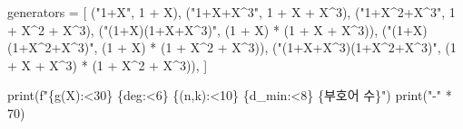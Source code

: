 \documentclass[
  oneside]{article}
\newenvironment{Shaded}{}{}
\newcommand{\BuiltInTok}[1]{\textcolor[rgb]{0.00,0.50,0.00}{#1}}
\newcommand{\DecValTok}[1]{\textcolor[rgb]{0.25,0.63,0.44}{#1}}
\newcommand{\NormalTok}[1]{#1}
\newcommand{\OperatorTok}[1]{\textcolor[rgb]{0.40,0.40,0.40}{#1}}
\newcommand{\SpecialCharTok}[1]{\textcolor[rgb]{0.25,0.44,0.63}{#1}}
\newcommand{\SpecialStringTok}[1]{\textcolor[rgb]{0.73,0.40,0.53}{#1}}
\newcommand{\StringTok}[1]{\textcolor[rgb]{0.25,0.44,0.63}{#1}}
\begin{document}
\begin{Shaded}
\begin{Highlighting}[]
\NormalTok{generators }\OperatorTok{=}\NormalTok{ [}
\NormalTok{    (}\StringTok{"1+X"}\NormalTok{,                    }\DecValTok{1} \OperatorTok{+}\NormalTok{ X),}
\NormalTok{    (}\StringTok{"1+X+X\^{}3"}\NormalTok{,                }\DecValTok{1} \OperatorTok{+}\NormalTok{ X }\OperatorTok{+}\NormalTok{ X}\OperatorTok{\^{}}\DecValTok{3}\NormalTok{),}
\NormalTok{    (}\StringTok{"1+X\^{}2+X\^{}3"}\NormalTok{,              }\DecValTok{1} \OperatorTok{+}\NormalTok{ X}\OperatorTok{\^{}}\DecValTok{2} \OperatorTok{+}\NormalTok{ X}\OperatorTok{\^{}}\DecValTok{3}\NormalTok{),}
\NormalTok{    (}\StringTok{"(1+X)(1+X+X\^{}3)"}\NormalTok{,         (}\DecValTok{1} \OperatorTok{+}\NormalTok{ X) }\OperatorTok{*}\NormalTok{ (}\DecValTok{1} \OperatorTok{+}\NormalTok{ X }\OperatorTok{+}\NormalTok{ X}\OperatorTok{\^{}}\DecValTok{3}\NormalTok{)),}
\NormalTok{    (}\StringTok{"(1+X)(1+X\^{}2+X\^{}3)"}\NormalTok{,       (}\DecValTok{1} \OperatorTok{+}\NormalTok{ X) }\OperatorTok{*}\NormalTok{ (}\DecValTok{1} \OperatorTok{+}\NormalTok{ X}\OperatorTok{\^{}}\DecValTok{2} \OperatorTok{+}\NormalTok{ X}\OperatorTok{\^{}}\DecValTok{3}\NormalTok{)),}
\NormalTok{    (}\StringTok{"(1+X+X\^{}3)(1+X\^{}2+X\^{}3)"}\NormalTok{,   (}\DecValTok{1} \OperatorTok{+}\NormalTok{ X }\OperatorTok{+}\NormalTok{ X}\OperatorTok{\^{}}\DecValTok{3}\NormalTok{) }\OperatorTok{*}\NormalTok{ (}\DecValTok{1} \OperatorTok{+}\NormalTok{ X}\OperatorTok{\^{}}\DecValTok{2} \OperatorTok{+}\NormalTok{ X}\OperatorTok{\^{}}\DecValTok{3}\NormalTok{)),}
\NormalTok{]}

\BuiltInTok{print}\NormalTok{(}\SpecialStringTok{f"}\SpecialCharTok{\{}\StringTok{\textquotesingle{}g(X)\textquotesingle{}}\SpecialCharTok{:\textless{}30\}}\SpecialStringTok{ }\SpecialCharTok{\{}\StringTok{\textquotesingle{}deg\textquotesingle{}}\SpecialCharTok{:\textless{}6\}}\SpecialStringTok{ }\SpecialCharTok{\{}\StringTok{\textquotesingle{}(n,k)\textquotesingle{}}\SpecialCharTok{:\textless{}10\}}\SpecialStringTok{ }\SpecialCharTok{\{}\StringTok{\textquotesingle{}d\_min\textquotesingle{}}\SpecialCharTok{:\textless{}8\}}\SpecialStringTok{ }\SpecialCharTok{\{}\StringTok{\textquotesingle{}부호어 수\textquotesingle{}}\SpecialCharTok{\}}\SpecialStringTok{"}\NormalTok{)}
\BuiltInTok{print}\NormalTok{(}\StringTok{"{-}"} \OperatorTok{*} \DecValTok{70}\NormalTok{)}


\end{Highlighting}
\end{Shaded}
\end{document}

